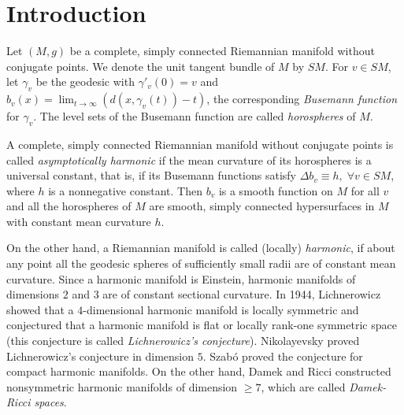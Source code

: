 \documentclass[12pt,a4paper]{amsart}
\theoremstyle{definition}
\theoremstyle{remark}
\newcommand \<{\langle}
\renewcommand \>{\rangle}
\begin{document}

\maketitle


\section{Introduction}

 Let $(M,g)$ be a complete, simply connected Riemannian
manifold without conjugate points.  We denote the unit tangent
bundle of $M$ by $SM$. For $v \in SM$, let $\gamma_{v}$ be the geodesic
with ${\gamma'_{v}}(0) = v$ and $b_{v} (x) =\displaystyle
\lim_{t\to \infty} (d (x,\gamma_v(t)) - t)$, the corresponding
\emph{Busemann function} for $\gamma_{v}$. The level sets
of the Busemann function are called \emph{horospheres} of $M$.

 A complete, simply connected Riemannian manifold without conjugate points is called \emph{asymptotically harmonic} if the mean curvature of its horospheres is a universal constant, that is, if
its Busemann functions satisfy $\Delta b_v \equiv h,\; \forall v
\in SM$, where $h$ is a nonnegative constant. Then $b_v$ is a
smooth function on $M$ for all
 $v$ and all the  horospheres of $M$ are smooth, simply connected
hypersurfaces in $M$ with constant mean curvature $h$.

On the other hand, a Riemannian manifold is called (locally) \emph{harmonic}, if about any point all the geodesic spheres of sufficiently small radii are of constant mean curvature. Since a harmonic manifold is Einstein, harmonic manifolds of dimensions $2$ and $3$ are of constant sectional curvature.  In 1944, Lichnerowicz \cite{Li} showed that a $4$-dimensional harmonic manifold is locally symmetric and conjectured that a harmonic manifold is flat or {locally} rank-one symmetric space (this conjecture is called \emph{Lichnerowicz's conjecture}). Nikolayevsky \cite{Ni} proved Lichnerowicz's conjecture in dimension $5$. Szab\'o \cite{Sz} proved the conjecture for compact harmonic manifolds.
On the other hand, Damek and Ricci \cite{DR} constructed nonsymmetric harmonic manifolds of dimension $\ge 7$, which are called \emph{Damek-Ricci spaces}.
\end{document}
